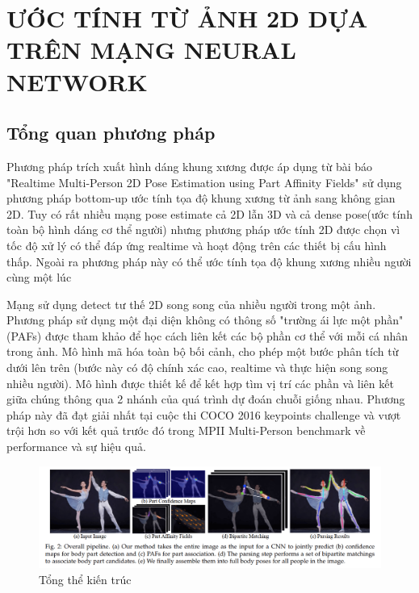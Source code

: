 \section{ƯỚC TÍNH TỪ ẢNH 2D DỰA TRÊN MẠNG NEURAL NETWORK}
\label{ss:2Dpose}
\subsection{Tổng quan phương pháp}
\label{sss:tong_quan_2D_pose}
Phương pháp trích xuất hình dáng khung xương được áp dụng từ bài báo "Realtime Multi-Person 2D Pose Estimation using Part Affinity Fields" \cite{cao2017realtime} sử dụng phương pháp bottom-up ước tính tọa độ khung xương từ ảnh sang không gian 2D. Tuy có rất nhiều mạng pose estimate cả 2D lẫn 3D và cả dense pose(ước tính toàn bộ hình dáng cơ thể người) nhưng phương pháp ước tính 2D được chọn vì tốc độ xử lý có thể đáp ứng realtime và hoạt động trên các thiết bị cấu hình thấp. Ngoài ra phương pháp này có thể ước tính tọa độ khung xương nhiều người cùng một lúc 

Mạng sử dụng  detect tư thế 2D song song của nhiều người trong một ảnh. Phương pháp sử dụng một đại diện không có thông số "trường ái lực một phần" (PAFs) được tham khảo để học cách liên kết các bộ phần cơ thể với mỗi cá nhân trong ảnh. Mô hình mã hóa toàn bộ bối cảnh, cho phép một bước phân tích từ dưới lên trên (bước này có độ chính xác cao, realtime và thực hiện song song nhiều người). Mô hình được thiết kế để kết hợp tìm vị trí các phần và liên kết giữa chúng thông qua 2 nhánh của quá trình dự đoán chuỗi giống nhau. Phương pháp này đã đạt giải nhất tại cuộc thi COCO 2016 keypoints challenge và vượt trội hơn so với kết quả trước đó trong MPII Multi-Person benchmark về performance và sự hiệu quả.


\FloatBarrier
\begin{figure}[htp]
\begin{center}
\includegraphics[scale=0.3]{chap3/c3_figs/pipeline.png}
\end{center}
\caption{Tổng thể kiến trúc}
\label{fig:pipeline}
\end{figure}
\FloatBarrier

